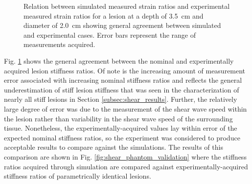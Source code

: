 			\begin{figure}[!htb]
				\centering
				\caption[Experimental validation of shear wave speed quantification model results]{Relation between simulated measured strain ratios and experimental measured strain ratios for a lesion at a depth of \SI{3.5}{\cm} and diameter of \SI{2.0}{\cm} showing general agreement between simulated and experimental cases. Error bars represent the range of measurements acquired.}
				\label{fig:shear_phantom_validation_nominal}
			\end{figure}

			Fig. \ref{fig:shear_phantom_validation_nominal} shows the general agreement between the nominal and experimentally acquired lesion stiffness ratios. Of note is the increasing amount of measurement error associated with increasing nominal stiffness ratios and reflects the general underestimation of stiff lesion stiffness that was seen in the characterization of nearly all stiff lesions in Section \ref{subsec:shear_results}. Further, the relatively large degree of error was due to the measurement of the shear wave speed within the lesion rather than variability in the shear wave speed of the surrounding tissue. Nonetheless, the experimentally-acquired values lay within error of the expected nominal stiffness ratios, so the experiment was considered to produce acceptable results to compare against the simulations. The results of this comparison are shown in Fig. \ref{fig:shear_phantom_validation} where the stiffness ratios acquired through simulation are compared against experimentally-acquired stiffness ratios of parametrically identical lesions.

